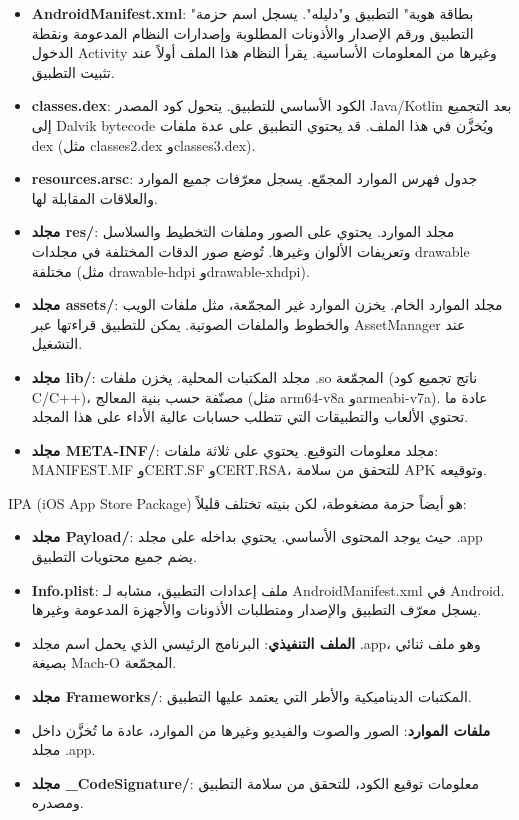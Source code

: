 \begin{itemize}
  \item \textbf{AndroidManifest.xml}: "بطاقة هوية" التطبيق و"دليله". يسجل اسم حزمة التطبيق ورقم الإصدار والأذونات المطلوبة وإصدارات النظام المدعومة ونقطة الدخول Activity وغيرها من المعلومات الأساسية. يقرأ النظام هذا الملف أولاً عند تثبيت التطبيق.
  \item \textbf{classes.dex}: الكود الأساسي للتطبيق. يتحول كود المصدر Java/Kotlin بعد التجميع إلى Dalvik bytecode ويُخزَّن في هذا الملف. قد يحتوي التطبيق على عدة ملفات dex (مثل classes2.dex وclasses3.dex).
  \item \textbf{resources.arsc}: جدول فهرس الموارد المجمّع. يسجل معرّفات جميع الموارد والعلاقات المقابلة لها.
  \item \textbf{مجلد res/}: مجلد الموارد. يحتوي على الصور وملفات التخطيط والسلاسل وتعريفات الألوان وغيرها. تُوضع صور الدقات المختلفة في مجلدات drawable مختلفة (مثل drawable-hdpi وdrawable-xhdpi).
  \item \textbf{مجلد assets/}: مجلد الموارد الخام. يخزن الموارد غير المجمّعة، مثل ملفات الويب والخطوط والملفات الصوتية. يمكن للتطبيق قراءتها عبر AssetManager عند التشغيل.
  \item \textbf{مجلد lib/}: مجلد المكتبات المحلية. يخزن ملفات .so المجمّعة (ناتج تجميع كود C/C++)، مصنّفة حسب بنية المعالج (مثل arm64-v8a وarmeabi-v7a). عادة ما تحتوي الألعاب والتطبيقات التي تتطلب حسابات عالية الأداء على هذا المجلد.
  \item \textbf{مجلد META-INF/}: مجلد معلومات التوقيع. يحتوي على ثلاثة ملفات: MANIFEST.MF وCERT.SF وCERT.RSA، للتحقق من سلامة APK وتوقيعه.
\end{itemize}


IPA (iOS App Store Package) هو أيضاً حزمة مضغوطة، لكن بنيته تختلف قليلاً:

\begin{itemize}
  \item \textbf{مجلد Payload/}: حيث يوجد المحتوى الأساسي. يحتوي بداخله على مجلد .app يضم جميع محتويات التطبيق.
  \item \textbf{Info.plist}: ملف إعدادات التطبيق، مشابه لـ AndroidManifest.xml في Android. يسجل معرّف التطبيق والإصدار ومتطلبات الأذونات والأجهزة المدعومة وغيرها.
  \item \textbf{الملف التنفيذي}: البرنامج الرئيسي الذي يحمل اسم مجلد .app، وهو ملف ثنائي بصيغة Mach-O المجمّعة.
  \item \textbf{مجلد Frameworks/}: المكتبات الديناميكية والأطر التي يعتمد عليها التطبيق.
  \item \textbf{ملفات الموارد}: الصور والصوت والفيديو وغيرها من الموارد، عادة ما تُخزَّن داخل مجلد .app.
  \item \textbf{مجلد \_CodeSignature/}: معلومات توقيع الكود، للتحقق من سلامة التطبيق ومصدره.
\end{itemize}

